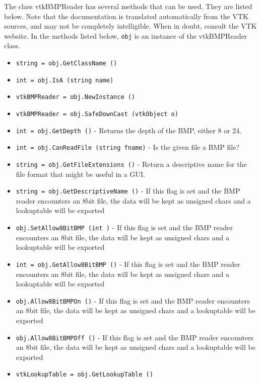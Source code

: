 The class vtkBMPReader has several methods that can be used.
  They are listed below.
Note that the documentation is translated automatically from the VTK sources,
and may not be completely intelligible.  When in doubt, consult the VTK website.
In the methods listed below, \verb|obj| is an instance of the vtkBMPReader class.
\begin{itemize}
\item  \verb|string = obj.GetClassName ()|

\item  \verb|int = obj.IsA (string name)|

\item  \verb|vtkBMPReader = obj.NewInstance ()|

\item  \verb|vtkBMPReader = obj.SafeDownCast (vtkObject o)|

\item  \verb|int = obj.GetDepth ()| -  Returns the depth of the BMP, either 8 or 24.

\item  \verb|int = obj.CanReadFile (string fname)| -  Is the given file a BMP file?

\item  \verb|string = obj.GetFileExtensions ()| -  Return a descriptive name for the file format that might be useful in a GUI.

\item  \verb|string = obj.GetDescriptiveName ()| -  If this flag is set and the BMP reader encounters an 8bit file,
 the data will be kept as unsigned chars and a lookuptable will be
 exported

\item  \verb|obj.SetAllow8BitBMP (int )| -  If this flag is set and the BMP reader encounters an 8bit file,
 the data will be kept as unsigned chars and a lookuptable will be
 exported

\item  \verb|int = obj.GetAllow8BitBMP ()| -  If this flag is set and the BMP reader encounters an 8bit file,
 the data will be kept as unsigned chars and a lookuptable will be
 exported

\item  \verb|obj.Allow8BitBMPOn ()| -  If this flag is set and the BMP reader encounters an 8bit file,
 the data will be kept as unsigned chars and a lookuptable will be
 exported

\item  \verb|obj.Allow8BitBMPOff ()| -  If this flag is set and the BMP reader encounters an 8bit file,
 the data will be kept as unsigned chars and a lookuptable will be
 exported

\item  \verb|vtkLookupTable = obj.GetLookupTable ()|

\end{itemize}
